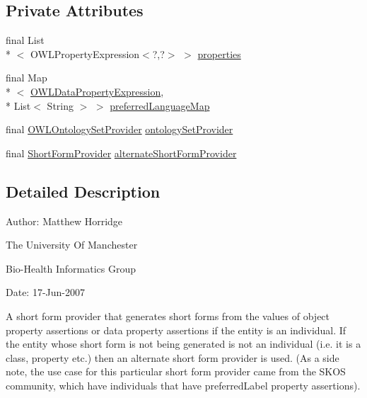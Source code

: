 \subsection*{Private Attributes}
\begin{DoxyCompactItemize}
\item 
final List\\*
$<$ O\-W\-L\-Property\-Expression$<$?,?$>$ $>$ \hyperlink{classorg_1_1semanticweb_1_1owlapi_1_1util_1_1_property_assertion_value_short_form_provider_a07edbe5f15f2554fd362a1bfb0cd183e}{properties}
\item 
final Map\\*
$<$ \hyperlink{interfaceorg_1_1semanticweb_1_1owlapi_1_1model_1_1_o_w_l_data_property_expression}{O\-W\-L\-Data\-Property\-Expression}, \\*
List$<$ String $>$ $>$ \hyperlink{classorg_1_1semanticweb_1_1owlapi_1_1util_1_1_property_assertion_value_short_form_provider_a0f8fae8460337c21d7b175c4fc5f07da}{preferred\-Language\-Map}
\item 
final \hyperlink{interfaceorg_1_1semanticweb_1_1owlapi_1_1model_1_1_o_w_l_ontology_set_provider}{O\-W\-L\-Ontology\-Set\-Provider} \hyperlink{classorg_1_1semanticweb_1_1owlapi_1_1util_1_1_property_assertion_value_short_form_provider_a2b1b5f1bab4a372463d16ffb2fb197f8}{ontology\-Set\-Provider}
\item 
final \hyperlink{interfaceorg_1_1semanticweb_1_1owlapi_1_1util_1_1_short_form_provider}{Short\-Form\-Provider} \hyperlink{classorg_1_1semanticweb_1_1owlapi_1_1util_1_1_property_assertion_value_short_form_provider_aa82dbdde531f41a7b3d5bef0b5743417}{alternate\-Short\-Form\-Provider}
\end{DoxyCompactItemize}


\subsection{Detailed Description}
Author\-: Matthew Horridge\par
 The University Of Manchester\par
 Bio-\/\-Health Informatics Group\par
 Date\-: 17-\/\-Jun-\/2007\par
\par
 

A short form provider that generates short forms from the values of object property assertions or data property assertions if the entity is an individual. If the entity whose short form is not being generated is not an individual (i.\-e. it is a class, property etc.) then an alternate short form provider is used. (As a side note, the use case for this particular short form provider came from the S\-K\-O\-S community, which have individuals that have preferred\-Label property assertions). 

